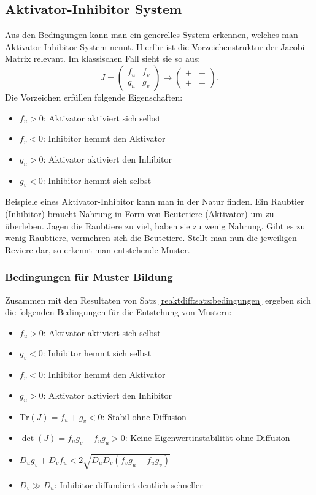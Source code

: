 \subsection{Aktivator-Inhibitor System}
Aus den Bedingungen kann man ein generelles System erkennen, welches man Aktivator-Inhibitor System nennt.
Hierfür ist die Vorzeichenstruktur der Jacobi-Matrix relevant.
Im klassischen Fall sieht sie so aus:
\begin{equation*}
        J =
    \begin{pmatrix}
        f_u & f_v\\
        g_u & g_v
    \end{pmatrix} 
    \rightarrow
    \begin{pmatrix}
        + & -\\
        + & -
    \end{pmatrix}.
\end{equation*}
Die Vorzeichen erfüllen folgende Eigenschaften:
\begin{itemize}
    \item \(f_u > 0\): Aktivator aktiviert sich selbst
    \item \(f_v < 0\): Inhibitor hemmt den Aktivator
    \item \(g_u > 0\): Aktivator aktiviert den Inhibitor
    \item \(g_v < 0\): Inhibitor hemmt sich selbst
\end{itemize}
Beispiele eines Aktivator-Inhibitor kann man in der Natur finden.
Ein Raubtier (Inhibitor) braucht Nahrung in Form von Beutetiere (Aktivator) um zu überleben.
Jagen die Raubtiere zu viel, haben sie zu wenig Nahrung.
Gibt es zu wenig Raubtiere, vermehren sich die Beutetiere.
Stellt man nun die jeweiligen Reviere dar, so erkennt man entstehende Muster.

\subsubsection{Bedingungen für Muster Bildung}
Zusammen mit den Resultaten von Satz \ref{reaktdiff:satz:bedingungen} ergeben sich die folgenden Bedingungen für die Entstehung von Mustern:
        \begin{itemize}
            \item \(f_u > 0\): Aktivator aktiviert sich selbst
            \item \(g_v < 0\): Inhibitor hemmt sich selbst
            \item \(f_v < 0\): Inhibitor hemmt den Aktivator
            \item \(g_u > 0\): Aktivator aktiviert den Inhibitor
            \item \(\text{Tr}(J) = f_u + g_v < 0\): Stabil ohne Diffusion
            \item \(\det(J) = f_u g_v - f_v g_u > 0\): Keine Eigenwertinstabilität ohne Diffusion
            \item \(D_u g_v + D_v f_u < 2\sqrt{D_u D_v (f_v g_u - f_u g_v)}\)
            \item \(D_v \gg D_u\): Inhibitor diffundiert deutlich schneller
        \end{itemize}

